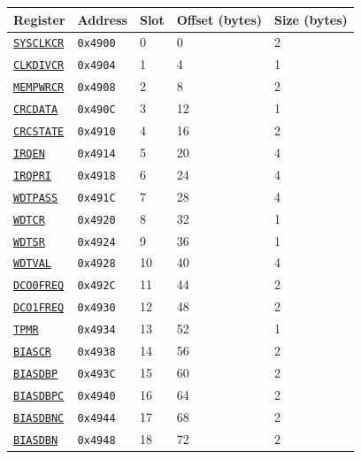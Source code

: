 \begin{tabularx}{\textwidth}{ l l l l X }
\textbf{Register} & \textbf{Address} & \textbf{Slot} & \textbf{Offset (bytes)} & \textbf{Size (bytes)} \\ \hline
\hyperref[ss:SYSCLKCR]{\texttt{SYSCLKCR}} & \texttt{0x4900} & 0 & 0 & 2 \\
\rowcolor{tablehighlightcolor} \hyperref[ss:CLKDIVCR]{\texttt{CLKDIVCR}} & \texttt{0x4904} & 1 & 4 & 1 \\
\hyperref[ss:MEMPWRCR]{\texttt{MEMPWRCR}} & \texttt{0x4908} & 2 & 8 & 2 \\
\rowcolor{tablehighlightcolor} \hyperref[ss:CRCDATA]{\texttt{CRCDATA}} & \texttt{0x490C} & 3 & 12 & 1 \\
\hyperref[ss:CRCSTATE]{\texttt{CRCSTATE}} & \texttt{0x4910} & 4 & 16 & 2 \\
\rowcolor{tablehighlightcolor} \hyperref[ss:IRQEN]{\texttt{IRQEN}} & \texttt{0x4914} & 5 & 20 & 4 \\
\hyperref[ss:IRQPRI]{\texttt{IRQPRI}} & \texttt{0x4918} & 6 & 24 & 4 \\
\rowcolor{tablehighlightcolor} \hyperref[ss:WDTPASS]{\texttt{WDTPASS}} & \texttt{0x491C} & 7 & 28 & 4 \\
\hyperref[ss:WDTCR]{\texttt{WDTCR}} & \texttt{0x4920} & 8 & 32 & 1 \\
\rowcolor{tablehighlightcolor} \hyperref[ss:WDTSR]{\texttt{WDTSR}} & \texttt{0x4924} & 9 & 36 & 1 \\
\hyperref[ss:WDTVAL]{\texttt{WDTVAL}} & \texttt{0x4928} & 10 & 40 & 4 \\
\rowcolor{tablehighlightcolor} \hyperref[ss:DCO0FREQ]{\texttt{DCO0FREQ}} & \texttt{0x492C} & 11 & 44 & 2 \\
\hyperref[ss:DCO1FREQ]{\texttt{DCO1FREQ}} & \texttt{0x4930} & 12 & 48 & 2 \\
\rowcolor{tablehighlightcolor} \hyperref[ss:TPMR]{\texttt{TPMR}} & \texttt{0x4934} & 13 & 52 & 1 \\
\hyperref[ss:BIASCR]{\texttt{BIASCR}} & \texttt{0x4938} & 14 & 56 & 2 \\
\rowcolor{tablehighlightcolor} \hyperref[ss:BIASDBP]{\texttt{BIASDBP}} & \texttt{0x493C} & 15 & 60 & 2 \\
\hyperref[ss:BIASDBPC]{\texttt{BIASDBPC}} & \texttt{0x4940} & 16 & 64 & 2 \\
\rowcolor{tablehighlightcolor} \hyperref[ss:BIASDBNC]{\texttt{BIASDBNC}} & \texttt{0x4944} & 17 & 68 & 2 \\
\hyperref[ss:BIASDBN]{\texttt{BIASDBN}} & \texttt{0x4948} & 18 & 72 & 2 \\
\hline
\end{tabularx}

